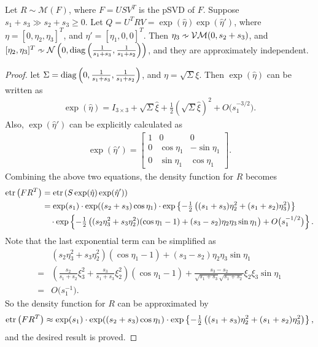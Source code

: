 \begin{theorem} \label{thm:MF-approx-2d}
	Let $R\sim\mathcal{M}(F)$, where $F=USV^T$ is the pSVD of $F$.
	Suppose $s_1+s_3\gg s_2+s_3 \geq 0$.
	Let $Q = U^TRV = \exp\left(\hat{\eta}\right) \exp\left(\hat{\eta}'\right)$, where $\eta = [0, \eta_2, \eta_3]^T$, and $\eta' = [\eta_1, 0, 0]^T$.
	Then $\eta_3 \approxsim \mathcal{VM}(0,s_2+s_3)$, and $ [\eta_2, \eta_3]^T  \approxsim \mathcal{N}\left( 0, \diag\left( \tfrac{1}{s_1+s_3}, \tfrac{1}{s_1+s_2} \right) \right)$, and they are approximately independent.
\end{theorem}
\begin{proof}
	let $\Sigma = \mathrm{diag}\left( 0, \tfrac{1}{s_1+s_3}, \tfrac{1}{s_1+s_2} \right)$, and $\eta = \sqrt{\Sigma} \xi$.
	Then $\exp\left(\hat{\eta}\right)$ can be written as
	\begin{align*}
		\exp\left(\hat{\eta}\right) = I_{3\times 3} + \sqrt{\Sigma}\hat{\xi} + \tfrac{1}{2} \left( \sqrt{\Sigma}\hat{\xi} \right)^2 + O\big(s_1^{-3/2}\big).
	\end{align*}
	Also, $\exp\left(\hat{\eta}'\right)$ can be explicitly calculated as
	\begin{align*}
		\exp\left(\hat{\eta}'\right) = \begin{bmatrix}
			1 & 0 & 0 \\
			0 & \cos\eta_1 & -\sin\eta_1 \\
			0 & \sin\eta_1 & \cos\eta_1
		\end{bmatrix}.
	\end{align*}
	Combining the above two equations, the density function for $R$ becomes
	\begin{align*}
		\mathrm{etr}\left( FR^T \right) &= \mathrm{etr}\left( S\exp(\hat{\eta})\exp(\hat{\eta}') \right) \\
		&= \exp(s_1) \cdot \exp((s_2+s_3)\cos\eta_1) \cdot \exp\left\{ -\tfrac{1}{2} \left( (s_1+s_3)\eta_2^2 + (s_1+s_2)\eta_3^2 \right) \right\} \\
		&\quad \cdot \exp\left\{ -\tfrac{1}{2}\left( (s_2\eta_3^2 + s_3\eta_2^2)(\cos\eta_1-1) + (s_3-s_2)\eta_2\eta_3\sin\eta_1 \right) + O\big(s_1^{-1/2}\big) \right\}.
	\end{align*}
	Note that the last exponential term can be simplified as
	\begin{align*}
		&(s_2\eta_3^2 + s_3\eta_2^2)(\cos\eta_1-1) + (s_3-s_2)\eta_2\eta_3\sin\eta_1 \\
		= &\left( \tfrac{s_2}{s_1+s_2}\xi_3^2 + \tfrac{s_3}{s_1+s_3}\xi_2^2 \right)(\cos\eta_1-1) + \tfrac{s_3-s_2}{\sqrt{s_1+s_3} \sqrt{s_1+s_2}} \xi_2\xi_3 \sin\eta_1 \\
		= & O\big(s_1^{-1}\big).
	\end{align*}
	So the density function for $R$ can be approximated by
	\begin{align*}
		\mathrm{etr}\left( FR^T \right) \approx \exp(s_1) \cdot \exp((s_2+s_3)\cos\eta_1) \cdot \exp\left\{ -\tfrac{1}{2} \left( (s_1+s_3)\eta_2^2 + (s_1+s_2)\eta_3^2 \right) \right\},
	\end{align*}
	and the desired result is proved.
\end{proof}

